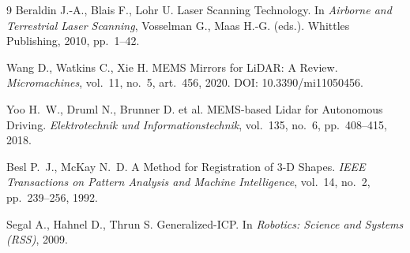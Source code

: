 \documentclass{misisarticle}
\begin{document}
\begin{thebibliography}{9}
 Beraldin J.-A., Blais F., Lohr U. Laser Scanning Technology. In \textit{Airborne and Terrestrial Laser Scanning}, Vosselman G., Maas H.-G. (eds.). Whittles Publishing, 2010, pp.~1--42.

 Wang D., Watkins C., Xie H. MEMS Mirrors for LiDAR: A Review. \textit{Micromachines}, vol.~11, no.~5, art.~456, 2020. DOI: 10.3390/mi11050456.

 Yoo H.~W., Druml N., Brunner D. et al. MEMS-based Lidar for Autonomous Driving. \textit{Elektrotechnik und Informationstechnik}, vol.~135, no.~6, pp.~408--415, 2018.

 Besl P.~J., McKay N.~D. A Method for Registration of 3-D Shapes. \textit{IEEE Transactions on Pattern Analysis and Machine Intelligence}, vol.~14, no.~2, pp.~239--256, 1992.

 Segal A., Hahnel D., Thrun S. Generalized-ICP. In \textit{Robotics: Science and Systems (RSS)}, 2009.

\end{thebibliography}
\end{document}
